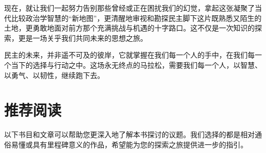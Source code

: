 \documentclass[UTF8, 10pt]{ctexbook}
\begin{document}
现在，就让我们一起努力告别那些曾经或正在困扰我们的幻觉，拿起这张凝聚了当代比较政治学智慧的“新地图”，更清醒地审视和勘探民主脚下这片既熟悉又陌生的土地，更勇敢地面对前方那个充满挑战与机遇的十字路口。这不仅是一次知识的探索，更是一场关乎我们共同未来的思想之旅。

民主的未来，并非遥不可及的彼岸，它就掌握在我们每一个人的手中，在我们每一个当下的选择与行动之中。这场永无终点的马拉松，需要我们每一个人，以智慧、以勇气、以韧性，继续跑下去。

\appendix
\chapter{推荐阅读}

\lettrine[lines=2]{以}{下}书目和文章可以帮助您更深入地了解本书探讨的议题。我们选择的都是相对通俗易懂或具有里程碑意义的作品，希望能为您的探索之旅提供进一步的指引。
\end{document}
